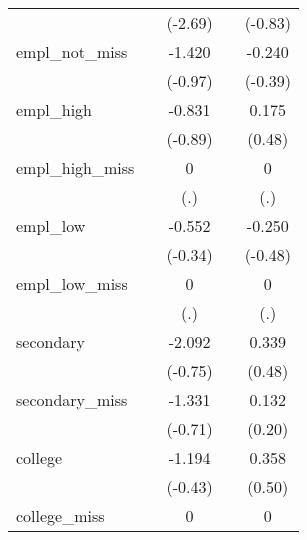 {\begin{tabular}{l*{4}{c}}
            &                     &     (-2.69)         &                     &     (-0.83)         \\
[1em]
empl\_not\_miss&                     &      -1.420         &                     &      -0.240         \\
            &                     &     (-0.97)         &                     &     (-0.39)         \\
[1em]
empl\_high   &                     &      -0.831         &                     &       0.175         \\
            &                     &     (-0.89)         &                     &      (0.48)         \\
[1em]
empl\_high\_miss&                     &           0         &                     &           0         \\
            &                     &         (.)         &                     &         (.)         \\
[1em]
empl\_low    &                     &      -0.552         &                     &      -0.250         \\
            &                     &     (-0.34)         &                     &     (-0.48)         \\
[1em]
empl\_low\_miss&                     &           0         &                     &           0         \\
            &                     &         (.)         &                     &         (.)         \\
[1em]
secondary   &                     &      -2.092         &                     &       0.339         \\
            &                     &     (-0.75)         &                     &      (0.48)         \\
[1em]
secondary\_miss&                     &      -1.331         &                     &       0.132         \\
            &                     &     (-0.71)         &                     &      (0.20)         \\
[1em]
college     &                     &      -1.194         &                     &       0.358         \\
            &                     &     (-0.43)         &                     &      (0.50)         \\
[1em]
college\_miss&                     &           0         &                     &           0         \\

\end{tabular}}
